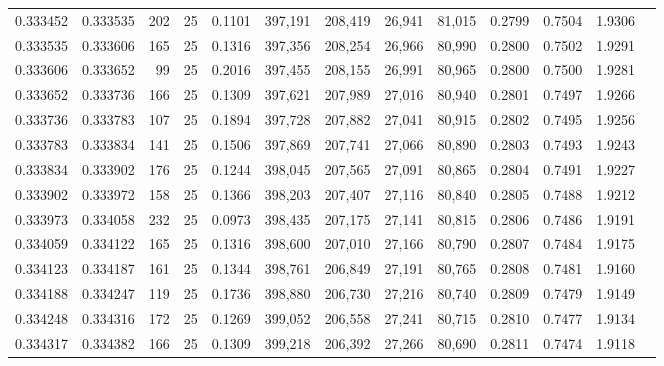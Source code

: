 \begin{tabular}{rrrrrrrrrrrrr}
0.333452 & 0.333535 &   202 &  25 &                                     0.1101 & 397,191 & 208,419 &  26,941 &  81,015 & 0.2799 & 0.7504 & 1.9306 \\
0.333535 & 0.333606 &   165 &  25 &                                     0.1316 & 397,356 & 208,254 &  26,966 &  80,990 & 0.2800 & 0.7502 & 1.9291 \\
0.333606 & 0.333652 &    99 &  25 &                                     0.2016 & 397,455 & 208,155 &  26,991 &  80,965 & 0.2800 & 0.7500 & 1.9281 \\
0.333652 & 0.333736 &   166 &  25 &                                     0.1309 & 397,621 & 207,989 &  27,016 &  80,940 & 0.2801 & 0.7497 & 1.9266 \\
0.333736 & 0.333783 &   107 &  25 &                                     0.1894 & 397,728 & 207,882 &  27,041 &  80,915 & 0.2802 & 0.7495 & 1.9256 \\
0.333783 & 0.333834 &   141 &  25 &                                     0.1506 & 397,869 & 207,741 &  27,066 &  80,890 & 0.2803 & 0.7493 & 1.9243 \\
0.333834 & 0.333902 &   176 &  25 &                                     0.1244 & 398,045 & 207,565 &  27,091 &  80,865 & 0.2804 & 0.7491 & 1.9227 \\
0.333902 & 0.333972 &   158 &  25 &                                     0.1366 & 398,203 & 207,407 &  27,116 &  80,840 & 0.2805 & 0.7488 & 1.9212 \\
0.333973 & 0.334058 &   232 &  25 &                                     0.0973 & 398,435 & 207,175 &  27,141 &  80,815 & 0.2806 & 0.7486 & 1.9191 \\
0.334059 & 0.334122 &   165 &  25 &                                     0.1316 & 398,600 & 207,010 &  27,166 &  80,790 & 0.2807 & 0.7484 & 1.9175 \\
0.334123 & 0.334187 &   161 &  25 &                                     0.1344 & 398,761 & 206,849 &  27,191 &  80,765 & 0.2808 & 0.7481 & 1.9160 \\
0.334188 & 0.334247 &   119 &  25 &                                     0.1736 & 398,880 & 206,730 &  27,216 &  80,740 & 0.2809 & 0.7479 & 1.9149 \\
0.334248 & 0.334316 &   172 &  25 &                                     0.1269 & 399,052 & 206,558 &  27,241 &  80,715 & 0.2810 & 0.7477 & 1.9134 \\
0.334317 & 0.334382 &   166 &  25 &                                     0.1309 & 399,218 & 206,392 &  27,266 &  80,690 & 0.2811 & 0.7474 & 1.9118 \\

\end{tabular}

